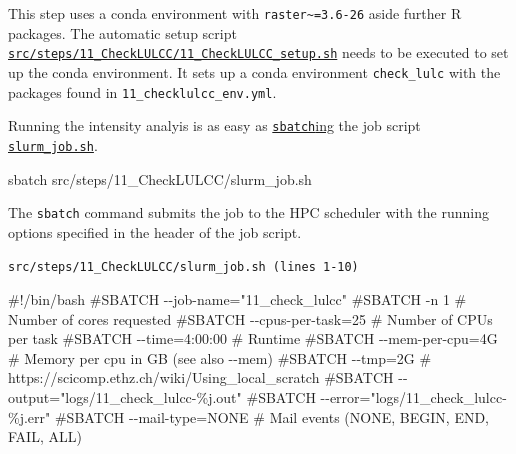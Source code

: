 \documentclass[
  letterpaper,
  DIV=11,
  numbers=noendperiod]{scrreprt}
\newenvironment{Shaded}{\begin{snugshade}}{\end{snugshade}}
\newcommand{\CommentTok}[1]{\textcolor[rgb]{0.37,0.37,0.37}{#1}}
\newcommand{\ExtensionTok}[1]{\textcolor[rgb]{0.00,0.23,0.31}{#1}}
\newcommand{\NormalTok}[1]{\textcolor[rgb]{0.00,0.23,0.31}{#1}}
\newcommand{\RegionMarkerTok}[1]{\textcolor[rgb]{0.00,0.23,0.31}{#1}}
\begin{document}
This step uses a conda environment with
\texttt{raster\textasciitilde{}=3.6-26} aside further R packages. The
automatic setup script
\href{https://github.com/cbueth/Future-EI/tree/main/src/steps/11_CheckLULCC/11_CheckLULCC_setup.sh}{\texttt{src/steps/11\_CheckLULCC/11\_CheckLULCC\_setup.sh}}
needs to be executed to set up the conda environment. It sets up a conda
environment \texttt{check\_lulc} with the packages found in
\texttt{11\_checklulcc\_env.yml}.

Running the intensity analyis is as easy as
\href{https://slurm.schedmd.com/sbatch.html}{\texttt{sbatch}ing} the job
script
\href{https://github.com/cbueth/Future-EI/tree/main/src/steps/11_CheckLULCC/slurm_job.sh}{\texttt{slurm\_job.sh}}.

\begin{Shaded}
\begin{Highlighting}[]
\ExtensionTok{sbatch}\NormalTok{ src/steps/11\_CheckLULCC/slurm\_job.sh}
\end{Highlighting}
\end{Shaded}

The \texttt{sbatch} command submits the job to the HPC scheduler with
the running options specified in the header of the job script.

\begin{codelisting}

\caption{\texttt{src/steps/11\_CheckLULCC/slurm\_job.sh (lines 1-10)}}

\begin{Shaded}
\begin{Highlighting}[]
\CommentTok{\#!/bin/bash}
\CommentTok{\#SBATCH {-}{-}job{-}name="11\_check\_lulcc"}
\CommentTok{\#SBATCH {-}n 1                  \# Number of cores requested}
\CommentTok{\#SBATCH {-}{-}cpus{-}per{-}task=25    \# Number of CPUs per task}
\CommentTok{\#SBATCH {-}{-}time=4:00:00        \# Runtime}
\CommentTok{\#SBATCH {-}{-}mem{-}per{-}cpu=4G      \# Memory per cpu in GB (see also {-}{-}mem)}
\CommentTok{\#SBATCH {-}{-}tmp=2G              \# https://scicomp.ethz.ch/wiki/Using\_local\_scratch}
\CommentTok{\#SBATCH {-}{-}output="logs/11\_check\_lulcc{-}\%j.out"}
\CommentTok{\#SBATCH {-}{-}error="logs/11\_check\_lulcc{-}\%j.err"}
\CommentTok{\#SBATCH {-}{-}mail{-}type=NONE       \# Mail events (NONE, }\RegionMarkerTok{BEGIN}\CommentTok{, }\RegionMarkerTok{END}\CommentTok{, FAIL, ALL)}
\end{Highlighting}
\end{Shaded}

\end{codelisting}
\end{document}
